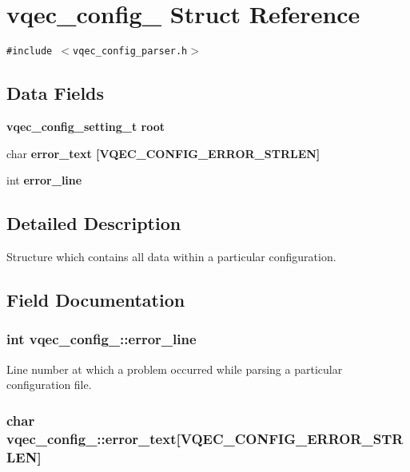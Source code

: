 \section{vqec\_\-config\_\- Struct Reference}
\label{structvqec__config__}
{\tt \#include $<$vqec\_\-config\_\-parser.h$>$}

\subsection*{Data Fields}
\begin{CompactItemize}
\item 
\bf{vqec\_\-config\_\-setting\_\-t} \bf{root}
\item 
char \bf{error\_\-text} [VQEC\_\-CONFIG\_\-ERROR\_\-STRLEN]
\item 
int \bf{error\_\-line}
\end{CompactItemize}


\subsection{Detailed Description}
Structure which contains all data within a particular configuration. 



\subsection{Field Documentation}
\subsubsection{\setlength{\rightskip}{0pt plus 5cm}int \bf{vqec\_\-config\_\-::error\_\-line}}\label{structvqec__config___456e02aa81b440cb631643b56b99cb2e}


Line number at which a problem occurred while parsing a particular configuration file. 
\subsubsection{\setlength{\rightskip}{0pt plus 5cm}char \bf{vqec\_\-config\_\-::error\_\-text}[VQEC\_\-CONFIG\_\-ERROR\_\-STRLEN]}\label{structvqec__config___c9dd14b58a7bac6f9ddad17022da5bc4}


